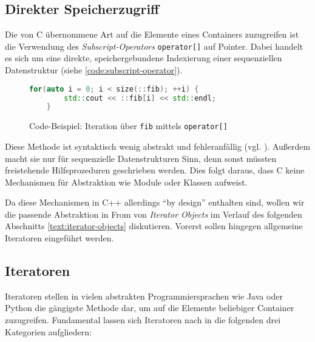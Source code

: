 \documentclass[runningheads]{llncs}
\begin{document}
\subsection{Direkter Speicherzugriff}

Die von C übernommene Art auf die Elemente eines Containers zuzugreifen ist die Verwendung des \textit{Subscript-Operators} \texttt{operator[]} auf Pointer. %
Dabei handelt es sich um eine direkte, speichergebundene Indexierung einer sequenziellen Datenstruktur (siehe \autoref{code:subscript-operator}).

\begin{figure}[H]
	\centering
	\caption{Code-Beispiel: Iteration über \texttt{fib} mittels \texttt{operator[]}}
	\label{code:subscript-operator}
	\begin{lstlisting}[language=C++]
	for(auto i = 0; i < size(::fib); ++i) {
		std::cout << ::fib[i] << std::endl;
	}\end{lstlisting}
\end{figure}

\noindent Diese Methode ist syntaktisch wenig abstrakt und fehleranfällig (vgl. \cite[S.274]{plp}).
Außerdem macht sie nur für sequenzielle Datenstrukturen Sinn, denn sonst müssten freistehende Hilfsprozeduren geschrieben werden.
Dies folgt daraus, dass C keine Mechanismen für Abstraktion wie Module oder Klassen aufweist.

Da diese Mechanismen in C++ allerdings \enquote{by design} enthalten sind, wollen wir die passende Abstraktion in From von \textit{Iterator Objects} im Verlauf des folgenden Abschnitts \ref{text:iterator-objects} diskutieren.
Vorerst sollen hingegen allgemeine Iteratoren eingeführt werden.

\subsection{Iteratoren}

Iteratoren stellen in vielen abstrakten Programmiersprachen wie Java oder Python die gängigste Methode dar, um auf die Elemente beliebiger Container zuzugreifen.
Fundamental lassen sich Iteratoren nach \cite[S.269ff.]{plp} in die folgenden drei Kategorien aufgliedern:
\end{document}
